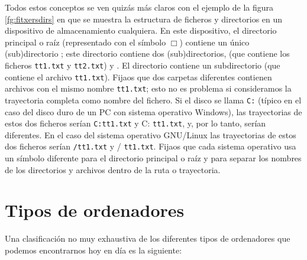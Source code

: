 Todos estos conceptos se ven quizás más claros con el ejemplo de la figura \ref{fg:fitxersdirs} en que se muestra la estructura de ficheros y directorios en un dispositivo de almacenamiento cualquiera. En este dispositivo, el directorio principal o raíz (representado con el símbolo $\Box$) contiene un único (sub)directorio ; este directorio contiene dos (sub)directorios,  (que contiene los ficheros \texttt{tt1.txt} y \texttt{tt2.txt}) y . El directorio  contiene un subdirectorio  (que contiene el archivo \texttt{tt1.txt}). Fijaos que dos carpetas diferentes contienen archivos con el mismo nombre \texttt{tt1.txt}; esto no es problema si consideramos la trayectoria completa como nombre del fichero. Si el disco se llama \texttt{C:} (típico en el caso del disco duro de un PC con sistema operativo Windows), las trayectorias de estos dos ficheros serían \texttt{C:}\barra{}\barra{}\barra\texttt{tt1.txt} y C: \texttt{}\barra{}\barra{}\barra{}\barra\texttt{tt1.txt}, y, por lo tanto, serían diferentes. En el caso del sistema operativo GNU/Linux las trayectorias de estos dos ficheros serían \texttt{/}\texttt{tt1.txt} y / \texttt{}\texttt{tt1.txt}. Fijaos que cada sistema operativo usa un símbolo diferente para el directorio principal o raíz y para separar los nombres de los directorios y archivos dentro de la ruta o trayectoria. 

\section{Tipos de ordenadores} Una clasificación no muy exhaustiva de los diferentes tipos de ordenadores que podemos encontrarnos hoy en día es la siguiente: 

